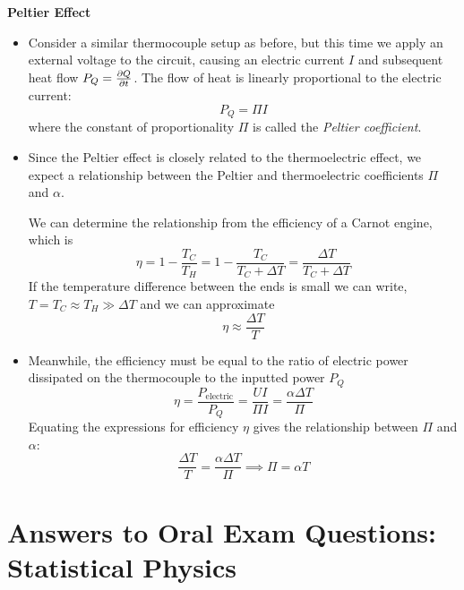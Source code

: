 \documentclass[11pt, a4paper]{article}
\begin{document}
\textbf{Peltier Effect}
\begin{itemize}
	\item Consider a similar thermocouple setup as before, but this time we apply an external voltage to the circuit, causing an electric current $ I $ and subsequent heat flow $ P_{Q} = \pdv{Q}{t} $. The flow of heat is linearly proportional to the electric current:
	\begin{equation*}
		P_{Q} = \Pi I
	\end{equation*}
	where the constant of proportionality $ \Pi $ is called the \textit{Peltier coefficient}. 
	
	\item Since the Peltier effect is closely related to the thermoelectric effect, we expect a relationship between the Peltier and thermoelectric coefficients $ \Pi $ and $ \alpha $.
	
	We can determine the relationship from the efficiency of a Carnot engine, which is
	\begin{equation*}
		\eta = 1 - \frac{T_{C}}{T_{H}} = 1 - \frac{T_{C}}{T_{C} + \Delta T} = \frac{\Delta T}{T_{C} + \Delta T} 
	\end{equation*}
	If the temperature difference between the ends is small we can write, $ T = T_{C} \approx T_{H} \gg \Delta T $ and we can approximate
	\begin{equation*}
		\eta \approx \frac{\Delta T}{T}
	\end{equation*}
	
	\item Meanwhile, the efficiency must be equal to the ratio of electric power dissipated on the thermocouple to the inputted power $ P_{Q} $
	\begin{equation*}
		\eta = \frac{P_{\text{electric}}}{P_{Q}} = \frac{U I}{\Pi I} = \frac{\alpha \Delta T}{\Pi}
	\end{equation*}
	Equating the expressions for efficiency $ \eta $ gives the relationship between $ \Pi $ and $ \alpha $:
	\begin{equation*}
		\frac{\Delta T}{T} = \frac{\alpha \Delta T}{\Pi} \implies \Pi = \alpha T
	\end{equation*}
	
	
\end{itemize}

\newpage

\section{Answers to Oral Exam Questions: Statistical Physics}
\end{document}
